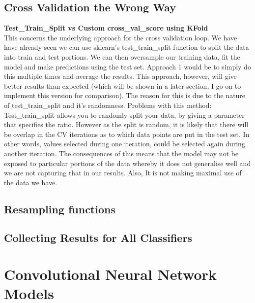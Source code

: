 \documentclass[12pt,a4paper,twoside]{report}
\begin{document}
\subsection{Cross Validation the Wrong Way}
\textbf{Test\_Train\_Split vs Custom cross\_val\_score using KFold}\\
This concerns the underlying approach for the cross validation loop. We have have already seen we can use sklearn's test\_train\_split function to split the data into train and test portions. We can then oversample our training data, fit the model and make predictions using the test set.
Approach 1 would be to simply do this multiple times and average the results.
This approach, however, will give better results than expected (which will be shown in a later section, I go on to implement this version for comparison). The reason for this is due to the nature of test\_train\_split and it's randomness.
Problems with this method:
Test\_train\_split allows you to randomly split your data, by giving a parameter that specifies the ratio. However as the split is random, it is likely that there will be overlap in the CV iterations as to which data points are put in the test set. In other words, values selected during one iteration, could be selected again during another iteration.
The consequences of this means that the model may not be exposed to particular portions of the data whereby it does not generalise well and we are not capturing that in our results. Also, It is not making maximal use of the data we have.

\subsection{Resampling functions}
\subsection{Collecting Results for All Classifiers}

\section{Convolutional Neural Network Models}
\end{document}
